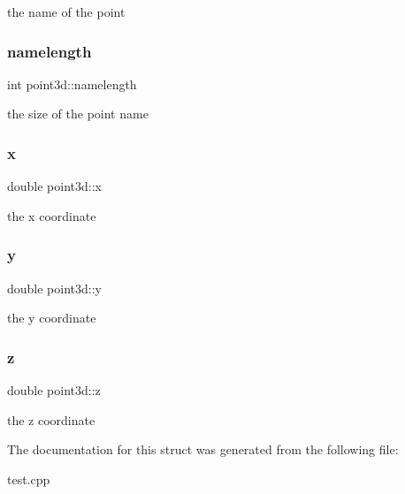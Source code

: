 the name of the point \mbox{\label{structpoint3d_a809caeed7433b4f182554ef12f8705a9}} 
\subsubsection{\texorpdfstring{namelength}{namelength}}
{\footnotesize\ttfamily int point3d\+::namelength}

the size of the point name \mbox{\label{structpoint3d_ac16dfc549efe0bd9b819ea4a9a8462a9}} 
\subsubsection{\texorpdfstring{x}{x}}
{\footnotesize\ttfamily double point3d\+::x}

the x coordinate \mbox{\label{structpoint3d_af76302f192767fd9546392affbe5631c}} 
\subsubsection{\texorpdfstring{y}{y}}
{\footnotesize\ttfamily double point3d\+::y}

the y coordinate \mbox{\label{structpoint3d_a96e63d7cd720242d2f79287b04a503e1}} 
\subsubsection{\texorpdfstring{z}{z}}
{\footnotesize\ttfamily double point3d\+::z}

the z coordinate 

The documentation for this struct was generated from the following file\+:\begin{DoxyCompactItemize}
\item 
test.\+cpp\end{DoxyCompactItemize}
